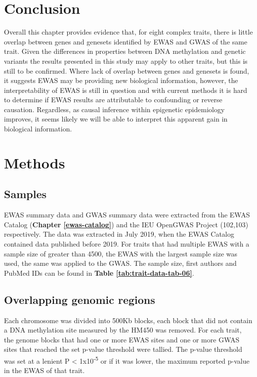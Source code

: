 \documentclass[11pt,oneside]{bristolthesis}
\begin{document}
\hypertarget{conclusion-06}{%
\section{Conclusion}\label{conclusion-06}}

Overall this chapter provides evidence that, for eight complex traits, there is little overlap between genes and genesets identified by EWAS and GWAS of the same trait. Given the differences in properties between DNA methylation and genetic variants the results presented in this study may apply to other traits, but this is still to be confirmed. Where lack of overlap between genes and genesets is found, it suggests EWAS may be providing new biological information, however, the interpretability of EWAS is still in question and with current methods it is hard to determine if EWAS results are attributable to confounding or reverse causation. Regardless, as causal inference within epigenetic epidemiology improves, it seems likely we will be able to interpret this apparent gain in biological information.

\hypertarget{methods-06}{%
\section{Methods}\label{methods-06}}

\hypertarget{samples-06}{%
\subsection{Samples}\label{samples-06}}

EWAS summary data and GWAS summary data were extracted from the EWAS Catalog (\textbf{Chapter \ref{ewas-catalog}}) and the IEU OpenGWAS Project (102,103) respectively. The data was extracted in July 2019, when the EWAS Catalog contained data published before 2019. For traits that had multiple EWAS with a sample size of greater than 4500, the EWAS with the largest sample size was used, the same was applied to the GWAS. The sample size, first authors and PubMed IDs can be found in \textbf{Table \ref{tab:trait-data-tab-06}}.

\hypertarget{overlapping-genomic-regions}{%
\subsection{Overlapping genomic regions}\label{overlapping-genomic-regions}}

Each chromosome was divided into 500Kb blocks, each block that did not contain a DNA methylation site measured by the HM450 was removed. For each trait, the genome blocks that had one or more EWAS sites and one or more GWAS sites that reached the set p-value threshold were tallied. The p-value threshold was set at a lenient P \textless{} 1x10\textsuperscript{-5} or if it was lower, the maximum reported p-value in the EWAS of that trait.
\end{document}
